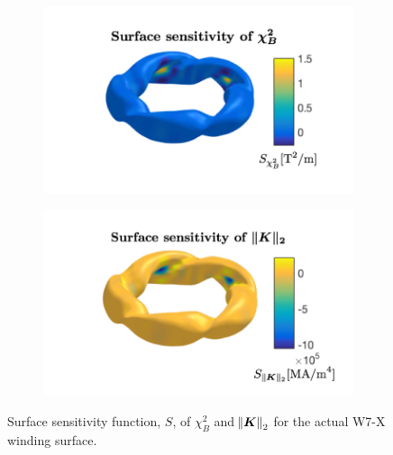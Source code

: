 \documentclass[aps,unsortedaddress]{revtex4-1}
\begin{document}
\begin{figure}
\begin{subfigure}[b]{0.4\textwidth}
\includegraphics[width=1\textwidth]{chi2_B_S.png}
\end{subfigure}
\begin{subfigure}[b]{0.4\textwidth}
\includegraphics[width=1\textwidth]{rms_K_S.png}
\end{subfigure}
\caption{Surface sensitivity function, $S$, of $\chi^2_B$ and $\norm{\bm{K}}_2$ for the actual W7-X winding surface. }
\label{w7x_sensitivity}
\end{figure}
\end{document}
